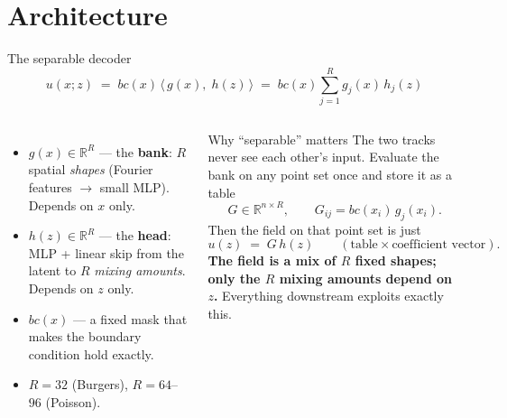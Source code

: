 \documentclass[10pt,aspectratio=169]{beamer}
\newcommand{\R}{\mathbb{R}}
\begin{document}
\section{Architecture}


\begin{frame}{The separable decoder}
  \[
    u(x;z) \;=\; bc(x)\,\big\langle\, g(x),\; h(z)\,\big\rangle
    \;=\; bc(x)\sum_{j=1}^{R} g_j(x)\,h_j(z)
  \]
  \begin{columns}[T]
    \begin{itemize}
      \item $g(x)\in\R^{R}$ --- the \textbf{bank}: $R$ spatial \emph{shapes} (Fourier features $\to$ small MLP). Depends on $x$ only.
      \item $h(z)\in\R^{R}$ --- the \textbf{head}: MLP + linear skip from the latent to $R$ \emph{mixing amounts}. Depends on $z$ only.
      \item $bc(x)$ --- a fixed mask that makes the boundary condition hold exactly.
      \item $R=32$ (Burgers), $R=64$--$96$ (Poisson).
    \end{itemize}
    \begin{block}{Why ``separable'' matters}
      The two tracks never see each other's input. Evaluate the bank on any point set once and store it as a table
      \[
        G \in \R^{n\times R},\qquad G_{ij} = bc(x_i)\,g_j(x_i).
      \]
      Then the field on that point set is just
      \[
        u(z) \;=\; G\,h(z) \qquad(\text{table}\times\text{coefficient vector}).
      \]
      \textbf{The field is a mix of $R$ fixed shapes; only the $R$ mixing amounts depend on $z$.}
      Everything downstream exploits exactly this.
    \end{block}
  \end{columns}
\end{frame}
\end{document}
